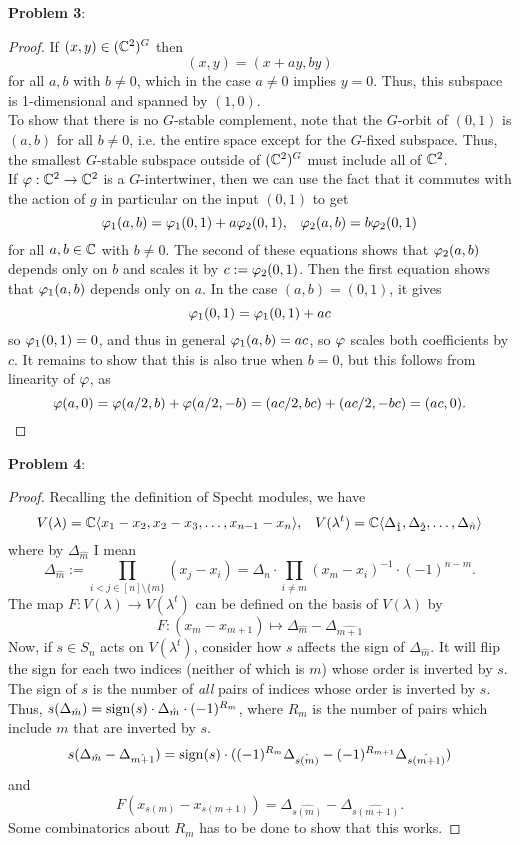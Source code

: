 \documentclass{amsart}
\begin{document}
	\textbf{Problem 3}:
	\begin{proof}
		If $(x,y)\in (\mathbb{C}^2)^G$ then
		$$
		(x,y) = (x+ay,by)
		$$
		for all $a,b$ with $b\neq 0$, which in the case $a\neq 0$ implies $y=0$. Thus, this subspace is 1-dimensional and spanned by $(1,0)$.\\
		
		To show that there is no $G$-stable complement, note that the $G$-orbit of $(0,1)$ is $(a,b)$ for all $b\neq 0$, i.e. the entire space except for the $G$-fixed subspace. Thus, the smallest $G$-stable subspace outside of $(\mathbb{C}^2)^G$ must include all of $\mathbb{C}^2$.\\
		
		If $\varphi:\mathbb{C}^2\to \mathbb{C}^2$ is a $G$-intertwiner, then we can use the fact that it commutes with the action of $g$ in particular on the input $(0,1)$ to get
		$$
		\varphi_1(a,b) = \varphi_1(0,1) + a\varphi_2(0,1), \;\;\; \varphi_2(a,b) = b\varphi_2(0,1)
		$$ 
		for all $a,b\in \mathbb{C}$ with $b\neq 0$. The second of these equations shows that $\varphi_2(a,b)$ depends only on $b$ and scales it by $c:=\varphi_2(0,1)$. Then the first equation shows that $\varphi_1(a,b)$ depends only on $a$. In the case $(a,b)=(0,1)$, it gives
		$$
		\varphi_1(0,1) = \varphi_1(0,1) + ac
		$$
		so $\varphi_1(0,1)=0$, and thus in general $\varphi_1(a,b)=ac$, so $\varphi$ scales both coefficients by $c$. It remains to show that this is also true when $b=0$, but this follows from linearity of $\varphi$, as
		$$
		\varphi(a,0) = \varphi(a/2,b) + \varphi(a/2,-b) = (ac/2,bc) + (ac/2,-bc) = (ac,0). 
		$$
	\end{proof}
	\newpage 
	
	\textbf{Problem 4}:
	\begin{proof}
		Recalling the definition of Specht modules, we have
		$$V(\lambda) = \mathbb{C}\langle x_1-x_2,x_2-x_3,\dots,x_{n-1}-x_n\rangle, \;\;\; V(\lambda^t) = \mathbb{C}\langle\Delta_{\hat{1}},\Delta_{\hat{2}},\dots,\Delta_{\hat{n}}\rangle$$
		where by $\Delta_{\hat{m}}$ I mean
		$$
		\Delta_{\hat{m}} := \prod_{i<j \in [n]\setminus \{m\}} (x_j-x_i) = \Delta_n \cdot \prod_{i\neq m} (x_m-x_i)^{-1} \cdot (-1)^{n-m}.
		$$
		The map $F:V(\lambda)\to V(\lambda^t)$ can be defined on the basis of $V(\lambda)$ by
		$$
		F: (x_{m}-x_{m+1}) \mapsto \Delta_{\hat{m}} - \Delta_{\hat{m+1}}
		$$
		Now, if $s\in S_n$ acts on $V(\lambda^t)$, consider how $s$ affects the sign of $\Delta_{\hat{m}}$. It will flip the sign for each two indices (neither of which is $m$) whose order is inverted by $s$. The sign of $s$ is the number of \textit{all} pairs of indices whose order is inverted by $s$. Thus, $s(\Delta_{\hat{m}}) = \operatorname{sign}(s)\cdot \Delta_{\hat{m}} \cdot (-1)^{R_m}$, where $R_m$ is the number of pairs which include $m$ that are inverted by $s$.
		$$
		s(\Delta_{\hat{m}} - \Delta_{\hat{m+1}}) = \operatorname{sign}(s) \cdot ((-1)^{R_m}\Delta_{\hat{s(m)}} - (-1)^{R_{m+1}}\Delta_{\hat{s(m+1)}})
		$$
		and 
		$$
		F(x_{s(m)} - x_{s(m+1)}) = \Delta_{\hat{s(m)}}-\Delta_{\hat{s(m+1)}}.
		$$
		Some combinatorics about $R_m$ has to be done to show that this works.
	\end{proof}
	\newpage 
	
\end{document}

